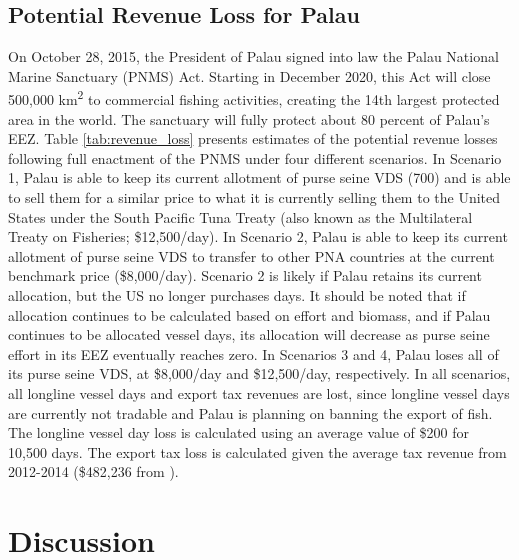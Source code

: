 \documentclass[9p,twocolumn,twoside,lineno]{pnas-new}
\begin{document}

\subsection{Potential Revenue Loss for Palau}

On October 28, 2015, the President of Palau signed into law the Palau National Marine Sanctuary (PNMS) Act. Starting in December 2020, this Act will close 500,000 km\textsuperscript{2} to commercial fishing activities, creating the 14th largest protected area in the world. The sanctuary will fully protect about 80 percent of Palau’s EEZ. Table \ref{tab:revenue_loss} presents estimates of the potential revenue losses following full enactment of the PNMS under four different scenarios. In Scenario 1, Palau is able to keep its current allotment of purse seine VDS (700) and is able to sell them for a similar price to what it is currently selling them to the United States under the South Pacific Tuna Treaty (also known as the Multilateral Treaty on Fisheries; \$12,500/day). In Scenario 2, Palau is able to keep its current allotment of purse seine VDS to transfer to other PNA countries at the current benchmark price (\$8,000/day). Scenario 2 is likely if Palau retains its current allocation, but the US no longer purchases days.  It should be noted that if allocation continues to be calculated based on effort and biomass, and if Palau continues to be allocated vessel days, its allocation will decrease as purse seine effort in its EEZ eventually reaches zero. In Scenarios 3 and 4, Palau loses all of its purse seine VDS, at \$8,000/day and \$12,500/day, respectively. In all scenarios, all longline vessel days and export tax revenues are lost, since longline vessel days are currently not tradable and Palau is planning on banning the export of fish. The longline vessel day loss is calculated using an average value of \$200 for 10,500 days. The export tax loss is calculated given the average tax revenue from 2012-2014 (\$482,236  from \cite{Gillett2016}). 



\section{Discussion}
\end{document}
